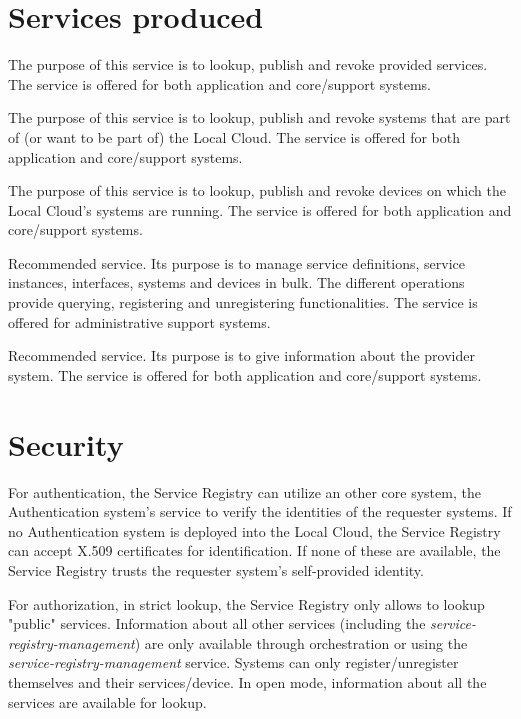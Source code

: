 \documentclass[a4paper]{arrowhead}
\begin{document}
\newpage

\section{Services produced}
\label{sec:services}

{}
The purpose of this service is to lookup, publish and revoke provided services. The service is offered for both application and core/support systems. 

The purpose of this service is to lookup, publish and revoke systems that are part of (or want to be part of) the Local Cloud. The service is offered for both application and core/support systems. 

The purpose of this service is to lookup, publish and revoke devices on which the Local Cloud's systems are running. The service is offered for both application and core/support systems. 

Recommended service.  Its purpose is to manage service definitions, service instances, interfaces, systems and devices in bulk. The different operations provide querying, registering and unregistering functionalities. The service is offered for administrative support systems. 

Recommended service. Its purpose is to give information about the provider system. The service is offered for both application and core/support systems.

\newpage

\section{Security}
\label{sec:security}

For authentication, the Service Registry can utilize an other core system, the Authentication system's service to verify the identities of the requester systems. If no Authentication system is deployed into the Local Cloud, the Service Registry can accept X.509 certificates for identification. If none of these are available, the Service Registry trusts the requester system's self-provided identity.

For authorization, in strict lookup, the Service Registry only allows to lookup "public" services. Information about all other services (including the \textit{service-registry-management}) are only available through orchestration or using the \textit{service-registry-management} service. Systems can only register/unregister themselves and their services/device. In open mode, information about all the services are available for lookup.
\end{document}
